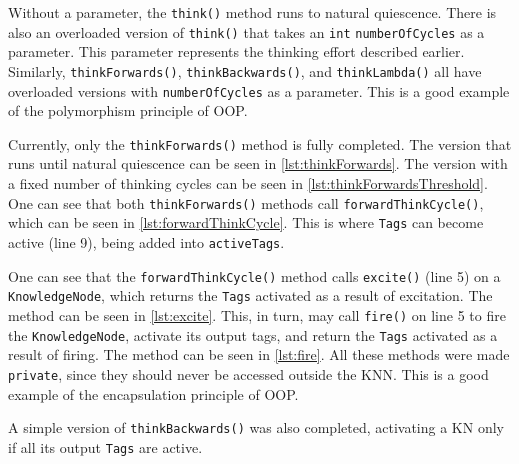 \documentclass[titlepage,11pt]{article}
\def \knnpath {"/Users/seanstappas1/GitHub/prometheus-ai/src/main/java/knn/api/KnowledgeNodeNetwork.java"}
\newcommand{\code}[1]{\texttt{#1}}
\begin{document}
Without a parameter, the \code{think()} method runs to natural quiescence. There is also an overloaded version of \code{think()} that takes an \code{int} \code{numberOfCycles} as a parameter. This parameter represents the thinking effort described earlier. Similarly, \code{thinkForwards()}, \code{thinkBackwards()}, and \code{thinkLambda()} all have overloaded versions with \code{numberOfCycles} as a parameter. This is a good example of the polymorphism principle of OOP.





Currently, only the \code{thinkForwards()} method is fully completed. The version that runs until natural quiescence can be seen in \autoref{lst:thinkForwards}. The version with a fixed number of thinking cycles can be seen in \autoref{lst:thinkForwardsThreshold}. One can see that both \code{thinkForwards()} methods call \code{forwardThinkCycle()}, which can be seen in \autoref{lst:forwardThinkCycle}. This is where \code{Tags} can become active (line 9), being added into \code{activeTags}.

One can see that the \code{forwardThinkCycle()} method calls \code{excite()} (line 5) on a \code{KnowledgeNode}, which returns the \code{Tags} activated as a result of excitation. The method can be seen in \autoref{lst:excite}. This, in turn, may call \code{fire()} on line 5 to fire the \code{KnowledgeNode}, activate its output tags, and return the \code{Tags} activated as a result of firing. The method can be seen in \autoref{lst:fire}. All these methods were made \code{private}, since they should never be accessed outside the KNN. This is a good example of the encapsulation principle of OOP.







A simple version of \code{thinkBackwards()} was also completed, activating a KN only if all its output \code{Tags} are active.
\end{document}
